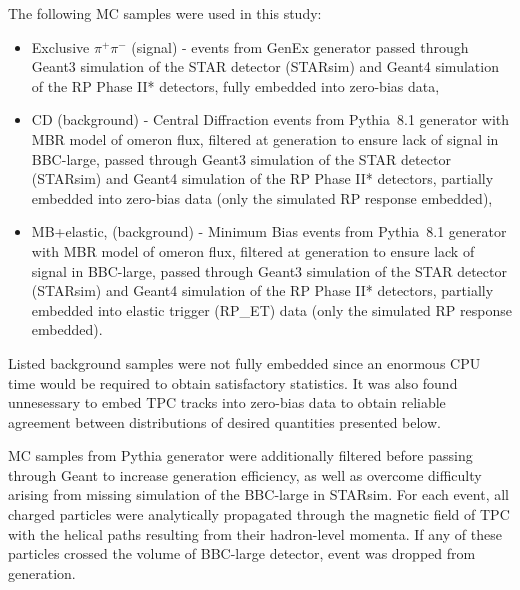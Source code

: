 The following MC samples were used in this study:\vspace*{-5pt}
\begin{itemize}
 \item Exclusive $\pi^{+}\pi^{-}$ (signal) - events from GenEx\cite{GenEx} generator passed through Geant3 simulation of the STAR detector (STARsim) and Geant4 simulation of the RP Phase II* detectors, fully embedded into zero-bias data,\vspace*{-5pt}
 \item CD (background) - Central Diffraction events from Pythia~8.1 generator with MBR model of \Pom omeron flux, filtered at generation to ensure lack of signal in BBC-large, passed through Geant3 simulation of the STAR detector (STARsim) and Geant4 simulation of the RP Phase II* detectors, partially embedded into zero-bias data (only the simulated RP response embedded),\vspace*{-5pt}
 \item MB+elastic, (background) - Minimum Bias events from Pythia~8.1 generator with MBR model of \Pom omeron flux, filtered at generation to ensure lack of signal in BBC-large, passed through Geant3 simulation of the STAR detector (STARsim) and Geant4 simulation of the RP Phase II* detectors, partially embedded into elastic trigger (RP\_ET) data (only the simulated RP response embedded).\vspace*{-5pt}
\end{itemize}

Listed background samples were not fully embedded since an enormous CPU time would be required to obtain satisfactory statistics. It was also found unnesessary to embed TPC tracks into zero-bias data to obtain reliable agreement between distributions of desired quantities presented below.

MC samples from Pythia generator were additionally filtered before passing through Geant to increase generation efficiency, as well as overcome difficulty arising from missing simulation of the BBC-large in STARsim. For each event, all charged particles were analytically propagated through the magnetic field of TPC with the helical paths resulting from their hadron-level momenta. If any of these particles crossed the volume of BBC-large detector, event was dropped from generation.

